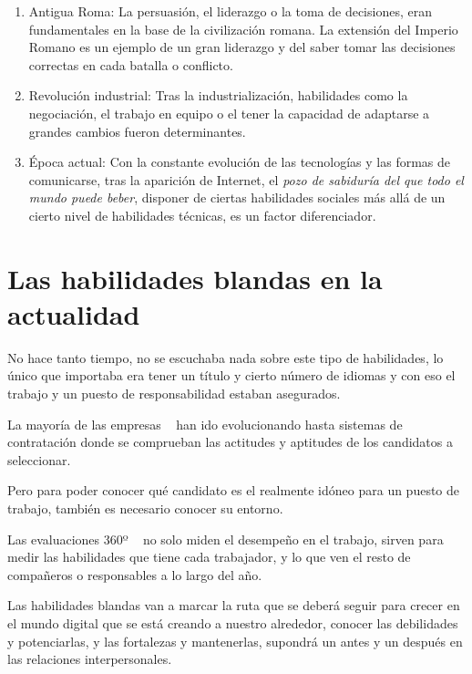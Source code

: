 \begin{enumerate}
	\item Antigua Roma: La persuasión, el liderazgo o la toma de decisiones, eran fundamentales en la base de la civilización romana. La extensión del Imperio Romano es un ejemplo de un gran liderazgo y del saber tomar las decisiones correctas en cada batalla o conflicto.
	\item Revolución industrial: Tras la industrialización, habilidades como la negociación, el trabajo en equipo o el tener la capacidad de adaptarse a grandes cambios fueron determinantes.
	\item Época actual: Con la constante evolución de las tecnologías y las formas de comunicarse, tras la aparición de Internet, el \textit{pozo de sabiduría del que todo el mundo puede beber}, disponer de ciertas habilidades sociales más allá de un cierto nivel de habilidades técnicas, es un factor diferenciador.
\end{enumerate}

\section{Las habilidades blandas en la actualidad}

No hace tanto tiempo, no se escuchaba nada sobre este tipo de habilidades, lo único que importaba era tener un título y cierto número de idiomas y con eso el trabajo y un puesto de responsabilidad estaban asegurados.

La mayoría de las empresas ~\cite{doc:skills} han ido evolucionando hasta sistemas de contratación donde se comprueban las actitudes y aptitudes de los candidatos a seleccionar.

Pero para poder conocer qué candidato es el realmente idóneo para un puesto de trabajo, también es necesario conocer su entorno.

Las evaluaciones 360º ~\cite{doc:eva360} no solo miden el desempeño en el trabajo, sirven para medir las habilidades que tiene cada trabajador, y lo que ven el resto de compañeros o responsables a lo largo del año.

Las habilidades blandas van a marcar la ruta que se deberá seguir para crecer en el mundo digital que se está creando a nuestro alrededor, conocer las debilidades y potenciarlas, y las fortalezas y mantenerlas, supondrá un antes y un después en las relaciones interpersonales.



